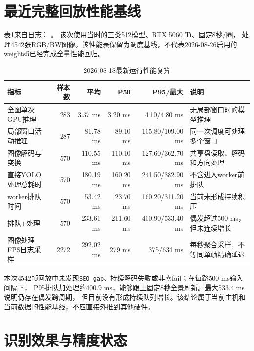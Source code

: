 \documentclass[UTF8,a4paper,11pt,openany]{ctexrep}
\begin{document}
\section{最近完整回放性能基线}

表\ref{tab:latest-performance}来自日志：
。
该次使用当时的三类512模型、RTX 5060 Ti、固定8秒/圈，
处理4542张RGB/BW图像。该性能表保留为调度基线，不代表2026-08-26启用的weights5已经完成全量性能回归。

\begin{table}[H]
  \centering
  \small
  \caption{2026-08-18最新运行性能复算}
  \label{tab:latest-performance}
  \begin{tabularx}{\textwidth}{p{4.4cm}rrrrX}
    \toprule
    指标 & 样本数 & 平均 & P50 & P95/最大 & 说明 \\
    \midrule
    全图单次GPU推理 & 283 & 3.37 ms & 3.20 ms & 4.10/4.80 ms & 无局部窗口时的模型推理 \\
    局部窗口活动推理 & 287 & 81.78 ms & 89.10 ms & 105.80/109.00 ms & 同一次调度可处理多个窗口 \\
    图像解码与变换 & 570 & 110.55 ms & 110.10 ms & 127.60/362.70 ms & 共享盘读取、解码和方向处理 \\
    直接YOLO处理总耗时 & 570 & 180.19 ms & 160.20 ms & 241.50/382.90 ms & 不含进入worker前排队 \\
    worker排队时间 & 570 & 53.42 ms & 23.70 ms & 160.20/311.20 ms & 当前未形成持续积压 \\
    排队+处理 & 570 & 233.61 ms & 211.60 ms & 400.90/533.40 ms & 偶发超过500 ms，但未连续增长 \\
    图像处理FPS日志采样 & 2272 & 292.02 ms & 279 ms & 375/634 ms & 每秒聚合采样，不等同单帧精确延迟 \\
    \bottomrule
  \end{tabularx}
\end{table}

本次4542帧回放中未发现\texttt{SEQ gap}、持续解码失败或非零fail；在每路500 ms输入间隔下，
P95排队加处理约400.9 ms，能够跟上固定8秒全景刷新。最大533.4 ms说明仍存在偶发跨周期，
但目前没有形成持续队列增长。该结论属于当前主机和当前数据的性能基线，不应直接外推到其他硬件。

\section{识别效果与精度状态}

\end{document}
